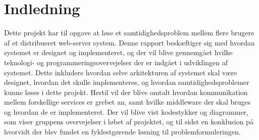 \chapter{Indledning}\label{ch:indledning}
Dette projekt har til opgave at løse et samtidighedsproblem mellem flere brugere af et distribueret web-server system.
Denne rapport beskæftiger sig med hvordan systemet er designet og implementeret, og der vil blive gennemgået hvilke teknologi- og programmeringsovervejelser der er indgået i udviklingen af systemet. Dette inkludere hvordan selve arkitekturen af systemet skal være designet, hvordan det skulle implementeres, og hvordan samtidighedsproblemer kunne løses i dette projekt. Hertil vil der blive omtalt hvordan kommunikation mellem forskellige services er grebet an, samt hvilke middleware der skal bruges og hvordan de er implementeret. Der vil blive vist kodestykker og diagrammer, som viser gruppens overvejelser i løbet af projektet, og til sidst en konklusion på hvorvidt der blev fundet en fyldestgørende løsning til problemformuleringen. 